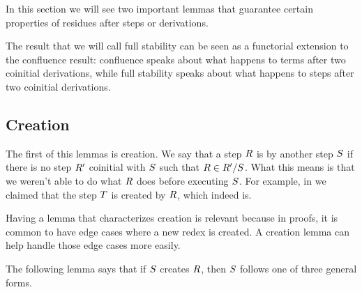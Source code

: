 

In this section we will see two important lemmas that guarantee certain properties
of residues after steps or derivations.

The result that we will call full stability can be seen as a functorial extension
to the confluence result: confluence speaks about what happens to terms after
two coinitial derivations,
while full stability speaks about what happens to steps after two coinitial derivations.

\subsection*{Creation}

The first of this lemmas is creation.
We say that a step $R$ is  by another step $S$ if
there is no step $R'$ coinitial with $S$ such that $R \in R' / S$.
What this means is that we weren't able to do what $R$ does before executing $S$.
For example, in  we claimed
that the step $T$ is created by $R$, which indeed is.

Having a lemma that characterizes creation is relevant because in proofs,
it is common to have edge cases where a new redex is created.
A creation lemma can help handle those edge cases more easily.

The following lemma says that if $S$ creates $R$, then $S$ follows
one of three general forms.


